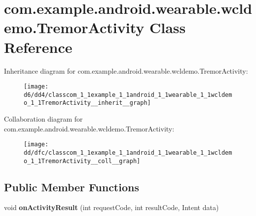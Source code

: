 \hypertarget{classcom_1_1example_1_1android_1_1wearable_1_1wcldemo_1_1TremorActivity}{}\section{com.\+example.\+android.\+wearable.\+wcldemo.\+Tremor\+Activity Class Reference}
\label{classcom_1_1example_1_1android_1_1wearable_1_1wcldemo_1_1TremorActivity}


Inheritance diagram for com.\+example.\+android.\+wearable.\+wcldemo.\+Tremor\+Activity\+:\nopagebreak
\begin{figure}[H]
\begin{center}
\leavevmode
\texttt{[image: d6/dd4/classcom\_1\_1example\_1\_1android\_1\_1wearable\_1\_1wcldemo\_1\_1TremorActivity\_\_inherit\_\_graph]}
\end{center}
\end{figure}


Collaboration diagram for com.\+example.\+android.\+wearable.\+wcldemo.\+Tremor\+Activity\+:\nopagebreak
\begin{figure}[H]
\begin{center}
\leavevmode
\texttt{[image: dd/dfc/classcom\_1\_1example\_1\_1android\_1\_1wearable\_1\_1wcldemo\_1\_1TremorActivity\_\_coll\_\_graph]}
\end{center}
\end{figure}
\subsection*{Public Member Functions}
\begin{DoxyCompactItemize}
\item 
void {\bfseries on\+Activity\+Result} (int request\+Code, int result\+Code, Intent data)\hypertarget{classcom_1_1example_1_1android_1_1wearable_1_1wcldemo_1_1TremorActivity_af12872baff997c8c77b121a77f98faf6}{}\label{classcom_1_1example_1_1android_1_1wearable_1_1wcldemo_1_1TremorActivity_af12872baff997c8c77b121a77f98faf6}

\end{DoxyCompactItemize}
